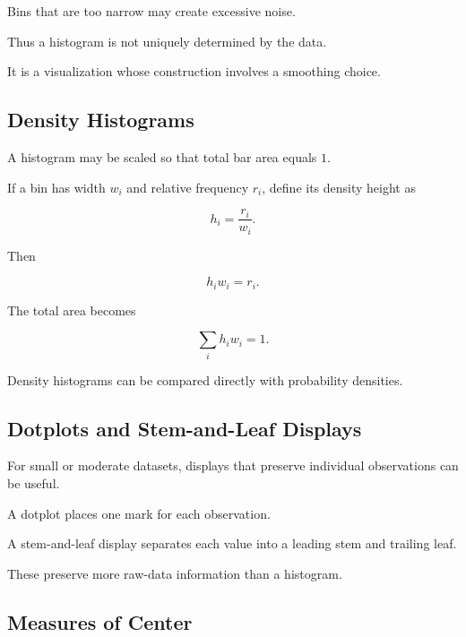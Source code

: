 Bins that are too narrow may create excessive noise.

Thus a histogram is not uniquely determined by the data.

It is a visualization whose construction involves a smoothing choice.

\subsection{Density Histograms}
\label{subsec:density-histograms}

A histogram may be scaled so that total bar area equals \(1\).

If a bin has width \(w_i\) and relative frequency \(r_i\), define its
density height as

\[
\boxed{
h_i
=
\frac{r_i}{w_i}.
}
\]

Then

\[
h_iw_i=r_i.
\]

The total area becomes

\[
\boxed{
\sum_i h_iw_i=1.
}
\]

Density histograms can be compared directly with probability densities.

\subsection{Dotplots and Stem-and-Leaf Displays}
\label{subsec:dotplots-stem-leaf}

For small or moderate datasets, displays that preserve individual
observations can be useful.

A dotplot places one mark for each observation.

A stem-and-leaf display separates each value into a leading stem and
trailing leaf.

These preserve more raw-data information than a histogram.

\subsection{Measures of Center}
\label{subsec:measures-of-center}

